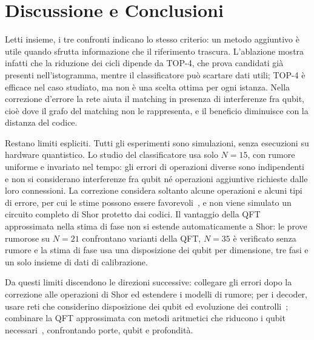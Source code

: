 \section*{Discussione e Conclusioni}

Letti insieme, i tre confronti indicano lo stesso criterio: un metodo aggiuntivo
è utile quando sfrutta informazione che il riferimento trascura.
L'ablazione mostra infatti che la riduzione dei cicli dipende da TOP-4, che prova
candidati già presenti nell'istogramma, mentre il classificatore può scartare
dati utili; TOP-4 è efficace nel caso studiato, ma non è una scelta ottima per
ogni istanza.
Nella correzione d'errore la rete aiuta il matching in presenza di interferenze
fra qubit, cioè dove il grafo del matching non le rappresenta, e il beneficio
diminuisce con la distanza del codice.

Restano limiti espliciti.
Tutti gli esperimenti sono simulazioni, senza esecuzioni su hardware quantistico.
Lo studio del classificatore usa solo $N=15$, con rumore uniforme e invariato nel
tempo: gli errori di operazioni diverse sono indipendenti e non si considerano
interferenze fra qubit né operazioni aggiuntive richieste dalle loro connessioni.
La correzione considera soltanto alcune operazioni e alcuni tipi di errore, per
cui le stime possono essere favorevoli~\cite{plaquette2026}, e non viene simulato
un circuito completo di Shor protetto dai codici.
Il vantaggio della QFT approssimata nella stima di fase non si estende
automaticamente a Shor: le prove rumorose su $N=21$ confrontano varianti della
QFT, $N=35$ è verificato senza rumore e la stima di fase usa una disposizione dei
qubit per dimensione, tre fasi e un solo insieme di dati di calibrazione.

Da questi limiti discendono le direzioni successive: collegare gli errori dopo la
correzione alle operazioni di Shor ed estendere i modelli di rumore; per i
decoder, usare reti che considerino disposizione dei qubit ed evoluzione dei
controlli~\cite{alphaqubit2024}; combinare la QFT approssimata con metodi
aritmetici che riducono i qubit necessari~\cite{chevignard2025}, confrontando
porte, qubit e profondità.

\par
\endgroup

\let\addcontentsline\abstractACL
\renewcommand{\theequation}{\thechapter.\arabic{equation}}
\renewcommand{\thetable}{\thechapter.\arabic{table}}
\setcounter{equation}{0}
\setcounter{table}{0}
\clearpage
